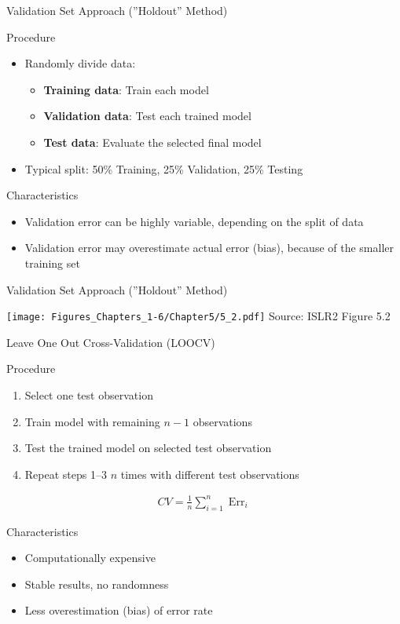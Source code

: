 \documentclass[ignorenonframetext,xcolor=x11names]{beamer}
\begin{document}
\begin{frame}{Validation Set Approach (''Holdout'' Method)}
\begin{block}{Procedure}
\begin{itemize}
\item Randomly divide data:
\begin{itemize}
   \item \textbf{Training data}: Train each model
   \item \textbf{Validation data}: Test each trained model
   \item \textbf{Test data}: Evaluate the selected final model
\end{itemize}
\item Typical split: 50\% Training, 25\% Validation, 25\% Testing
\end{itemize}
\end{block}

\begin{block}{Characteristics}
\begin{itemize} 
  \item Validation error can be highly variable, depending on the split of data
  \item Validation error may overestimate actual error (bias), because of the smaller training set
\end{itemize}
\end{block}
\end{frame}

\begin{frame}{Validation Set Approach (''Holdout'' Method)}
\centering 

\texttt{[image: Figures\_Chapters\_1-6/Chapter5/5\_2.pdf]}
\scriptsize Source: ISLR2 Figure 5.2
\end{frame}

\begin{frame}{Leave One Out Cross-Validation (LOOCV)}
\begin{block}{Procedure}
\begin{enumerate}
\item Select one test observation
\item Train model with remaining $n-1$ observations
\item Test the trained model on selected test observation
\item Repeat steps 1--3 $n$ times with different test observations
\end{enumerate}
\begin{align*}
CV = \frac{1}{n} \sum\nolimits_{i=1}^n \operatorname{Err}_i
\end{align*}
\end{block}

\begin{block}{Characteristics}
\begin{itemize} 
  \item Computationally expensive
  \item Stable results, no randomness
  \item Less overestimation (bias) of error rate
\end{itemize}
\end{block}
\end{frame}
\end{document}
